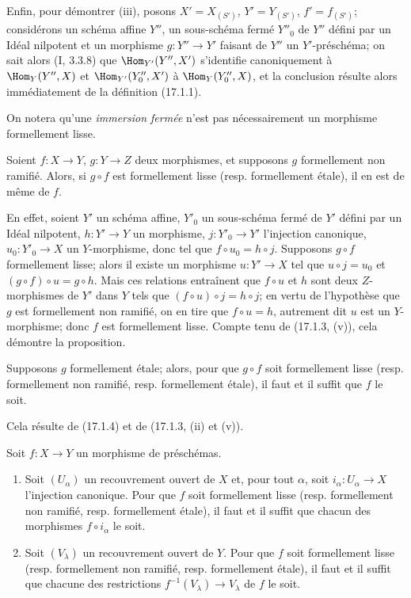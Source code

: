 Enfin, pour démontrer (iii), posons $X'=X_{(S')}$, $Y'=Y_{(S')}$, $f'=f_{(S')}$; considérons un schéma affine $Y''$, un sous-schéma fermé $Y''_0$ de $Y''$ défini par un Idéal nilpotent et un morphisme $g:Y''\to Y'$ faisant de $Y''$ un $Y'$-préschéma; on sait alors (I, 3.3.8) que $\Hom_{Y'}(Y'',X')$ s'identifie canoniquement à $\Hom_Y(Y'',X)$ et $\Hom_{Y'}(Y''_0,X')$ à $\Hom_Y(Y''_0,X)$, et la conclusion résulte alors immédiatement de la définition (17.1.1).

On notera qu'une \emph{immersion fermée} n'est pas nécessairement un morphisme formellement lisse.

\begin{proposition}[17.1.4]
\label{IV.17.1.4}
Soient $f:X\to Y$, $g:Y\to Z$ deux morphismes, et supposons $g$ formellement non ramifié. Alors, si $g\circ f$ est formellement lisse (resp. formellement étale), il en est de même de $f$.
\end{proposition}

En effet, soient $Y'$ un schéma affine, $Y'_0$ un sous-schéma fermé de $Y'$ défini par un Idéal nilpotent, $h:Y'\to Y$ un morphisme, $j:Y'_0\to Y'$ l'injection canonique, $u_0:Y'_0\to X$ un $Y$-morphisme, donc tel que $f\circ u_0=h\circ j$. Supposons $g\circ f$ formellement lisse; alors il existe un morphisme $u:Y'\to X$ tel que $u\circ j=u_0$ et $(g\circ f)\circ u=g\circ h$. Mais ces relations entraînent que $f\circ u$ et $h$ sont deux $Z$-morphismes de $Y'$ dans $Y$ tels que $(f\circ u)\circ j=h\circ j$; en vertu de l'hypothèse que $g$ est formellement non ramifié, on en tire que $f\circ u=h$, autrement dit $u$ est un $Y$-morphisme; donc $f$ est formellement lisse. Compte tenu de (17.1.3, (v)), cela démontre la proposition.

\begin{corollary}[17.1.5]
\label{IV.17.1.5}
Supposons $g$ formellement étale; alors, pour que $g\circ f$ soit formellement lisse (resp. formellement non ramifié, resp. formellement étale), il faut et il suffit que $f$ le soit.
\end{corollary}

Cela résulte de (17.1.4) et de (17.1.3, (ii) et (v)).

\begin{proposition}[17.1.6]
\label{IV.17.1.6}
Soit $f:X\to Y$ un morphisme de préschémas.
\begin{enumerate}
  \item[(i)] Soit $(U_\alpha)$ un recouvrement ouvert de $X$ et, pour tout $\alpha$, soit $i_\alpha:U_\alpha\to X$ l'injection canonique. Pour que $f$ soit formellement lisse (resp. formellement non ramifié, resp. formellement étale), il faut et il suffit que chacun des morphismes $f\circ i_\alpha$ le soit.
  \item[(ii)] Soit $(V_\lambda)$ un recouvrement ouvert de $Y$. Pour que $f$ soit formellement lisse (resp. formellement non ramifié, resp. formellement étale), il faut et il suffit que chacune des restrictions $f^{-1}(V_\lambda)\to V_\lambda$ de $f$ le soit.
\end{enumerate}
\end{proposition}

